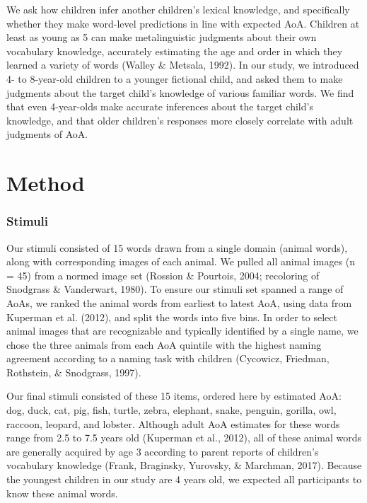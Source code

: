 \documentclass[10pt, letterpaper]{article}
\begin{document}
We ask how children infer another children's lexical knowledge, and
specifically whether they make word-level predictions in line with
expected AoA. Children at least as young as 5 can make metalinguistic
judgments about their own vocabulary knowledge, accurately estimating
the age and order in which they learned a variety of words (Walley \&
Metsala, 1992). In our study, we introduced 4- to 8-year-old children to
a younger fictional child, and asked them to make judgments about the
target child's knowledge of various familiar words. We find that even
4-year-olds make accurate inferences about the target child's knowledge,
and that older children's responses more closely correlate with adult
judgments of AoA.

\hypertarget{method}{%
\section{Method}\label{method}}

\hypertarget{stimuli}{%
\subsubsection{Stimuli}\label{stimuli}}

Our stimuli consisted of 15 words drawn from a single domain (animal
words), along with corresponding images of each animal. We pulled all
animal images (n = 45) from a normed image set (Rossion \& Pourtois,
2004; recoloring of Snodgrass \& Vanderwart, 1980). To ensure our
stimuli set spanned a range of AoAs, we ranked the animal words from
earliest to latest AoA, using data from Kuperman et al. (2012), and
split the words into five bins. In order to select animal images that
are recognizable and typically identified by a single name, we chose the
three animals from each AoA quintile with the highest naming agreement
according to a naming task with children (Cycowicz, Friedman, Rothstein,
\& Snodgrass, 1997).

Our final stimuli consisted of these 15 items, ordered here by estimated
AoA: dog, duck, cat, pig, fish, turtle, zebra, elephant, snake, penguin,
gorilla, owl, raccoon, leopard, and lobster. Although adult AoA
estimates for these words range from 2.5 to 7.5 years old (Kuperman et
al., 2012), all of these animal words are generally acquired by age 3
according to parent reports of children's vocabulary knowledge (Frank,
Braginsky, Yurovsky, \& Marchman, 2017). Because the youngest children
in our study are 4 years old, we expected all participants to know these
animal words.
\end{document}
